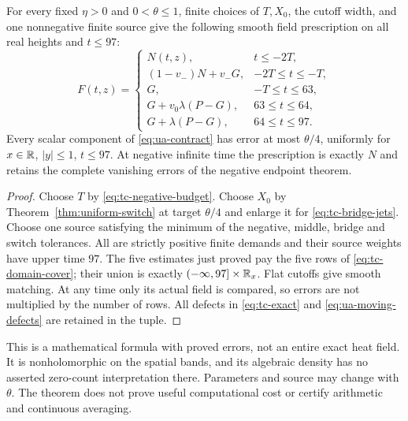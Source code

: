 \begin{theorem}
\label{thm:negative-central-cover}
For every fixed $\eta>0$ and $0<\theta\le1$, finite choices of
$T,X_0$, the cutoff width, and one nonnegative finite source give the
following smooth field prescription on all real heights and $t\le97$:
\begin{equation}
 F(t,z)=
 \begin{cases}
 N(t,z),&t\le-2T,\\
 (1-v_-)N+v_-G,&-2T\le t\le-T,\\
 G,&-T\le t\le63,\\
 G+v_0\lambda(P-G),&63\le t\le64,\\
 G+\lambda(P-G),&64\le t\le97.
 \end{cases}
 \label{eq:tc-domain-cover}
\end{equation}
Every scalar component of \eqref{eq:ua-contract} has error at most
$\theta/4$, uniformly for $x\in\mathbb R$, $|y|\le1$, $t\le97$.
At negative infinite time the prescription is exactly $N$ and retains
the complete vanishing errors of the negative endpoint theorem.
\end{theorem}
\begin{proof}
Choose $T$ by \eqref{eq:tc-negative-budget}. Choose $X_0$ by
Theorem~\ref{thm:uniform-switch} at target $\theta/4$ and enlarge it
for \eqref{eq:tc-bridge-jets}. Choose one source satisfying the minimum
of the negative, middle, bridge and switch tolerances. All are strictly
positive finite demands and their source weights have upper time $97$.
The five estimates just proved pay the five rows of
\eqref{eq:tc-domain-cover}; their union is exactly
$(-\infty,97]\times\mathbb R_x$. Flat cutoffs give smooth matching. At any
time only its actual field is compared, so errors are not multiplied by
the number of rows. All defects in \eqref{eq:tc-exact} and
\eqref{eq:ua-moving-defects} are retained in the tuple.
\end{proof}
This is a mathematical formula with proved errors, not an entire exact
heat field. It is nonholomorphic on the spatial bands, and its algebraic
density has no asserted zero-count interpretation there. Parameters and
source may change with $\theta$. The theorem does not prove useful
computational cost or certify arithmetic and continuous averaging.

